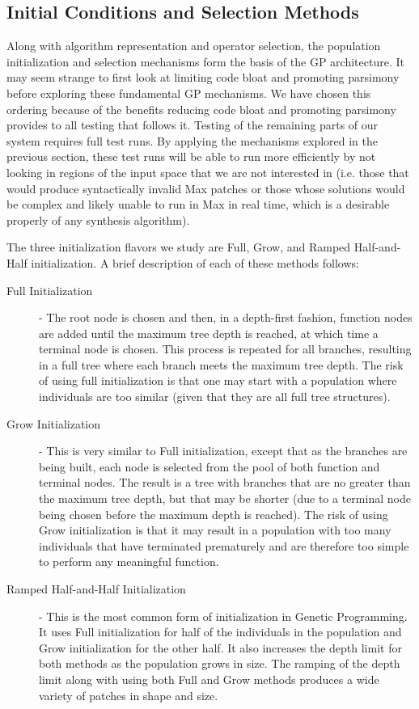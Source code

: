 \documentclass[a4paper,12pt]{report} 	%
\numberwithin{figure}{chapter}
\numberwithin{table}{chapter}
\numberwithin{equation}{chapter}
\begin{document}
\begin{flushleft}
\section{Initial Conditions and Selection Methods}

Along with algorithm representation and operator selection, the population initialization and selection mechanisms form the basis of the GP architecture. It may seem strange to first look at limiting code bloat and promoting parsimony before exploring these fundamental GP mechanisms. We have chosen this ordering because of the benefits reducing code bloat and promoting parsimony provides to all testing that follows it. Testing of the remaining parts of our system requires full test runs. By applying the mechanisms explored in the previous section, these test runs will be able to run more efficiently by not looking in regions of the input space that we are not interested in (i.e. those that would produce syntactically invalid Max patches or those whose solutions would be complex and likely unable to run in Max in real time, which is a desirable properly of any synthesis algorithm).

The three initialization flavors we study are Full, Grow, and Ramped Half-and-Half initialization. A brief description of each of these methods follows:
\begin{description}
\item [Full Initialization] - The root node is chosen and then, in a depth-first fashion, function nodes are added until the maximum tree depth is reached, at which time a terminal node is chosen. This process is repeated for all branches, resulting in a full tree where each branch meets the maximum tree depth. The risk of using full initialization is that one may start with a population where individuals are too similar (given that they are all full tree structures).
\item [Grow Initialization] - This is very similar to Full initialization, except that as the branches are being built, each node is selected from the pool of both function and terminal nodes. The result is a tree with branches that are no greater than the maximum tree depth, but that may be shorter (due to a terminal node being chosen before the maximum depth is reached). The risk of using Grow initialization is that it may result in a population with too many individuals that have terminated prematurely and are therefore too simple to perform any meaningful function.
\item [Ramped Half-and-Half Initialization] - This is the most common form of initialization in Genetic Programming. It uses Full initialization for half of the individuals in the population and Grow initialization for the other half. It also increases the depth limit for both methods as the population grows in size. The ramping of the depth limit along with using both Full and Grow methods produces a wide variety of patches in shape and size.
\end{description}


\end{flushleft}
\end{document}

